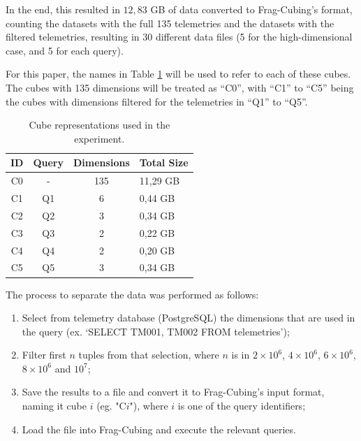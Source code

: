 In the end, this resulted in $12,83$ GB of data converted to Frag-Cubing's format, counting the datasets with the full 135 telemetries and the datasets with the filtered telemetries, resulting in 30 different data files (5 for the high-dimensional case, and 5 for each query).

For this paper, the names in Table \ref{tab:cubenotation} will be used to refer to each of these cubes.
The cubes with 135 dimensions will be treated as ``C0'', with ``C1'' to ``C5'' being the cubes with dimensions filtered for the telemetries in ``Q1'' to ``Q5''.


\begin{table}[H]
  \caption{Cube representations used in the experiment.}\label{tab:cubenotation}
  \centering
  \begin{tabular}{|c|c|c|p{2cm}|}
    \hline
    \bfseries ID &\bfseries Query &\bfseries Dimensions &\bfseries Total Size\\
    \hline
    C0 & - & 135 & 11,29 GB \\
    \hline
    C1 & Q1 & 6 & 0,44 GB \\
    \hline
    C2 & Q2 & 3 & 0,34 GB \\
    \hline
    C3 & Q3 & 2 & 0,22 GB \\
    \hline
    C4 & Q4 & 2 & 0,20 GB \\
    \hline
    C5 & Q5 & 3 & 0,34 GB \\
    \hline
  \end{tabular}
\end{table}

The process to separate the data was performed as follows:

\begin{enumerate}[noitemsep]
  \item Select from telemetry database (PostgreSQL) the dimensions that are used in the query (ex. `SELECT TM001, TM002 FROM telemetries');
  \item Filter first $n$ tuples from that selection, where $n$ is in \(\ensuremath{2\times 10^{6}}\), \(\ensuremath{4\times 10^{6}}\), \(\ensuremath{6\times 10^{6}}\), \(\ensuremath{8\times 10^{6}}\) and \(\ensuremath{10^{7}}\);
  \item Save the results to a file and convert it to Frag-Cubing's input format, naming it cube $i$ (eg. "C$i$"), where $i$ is one of the query identifiers;
  \item Load the file into Frag-Cubing and execute the relevant queries.
\end{enumerate}

